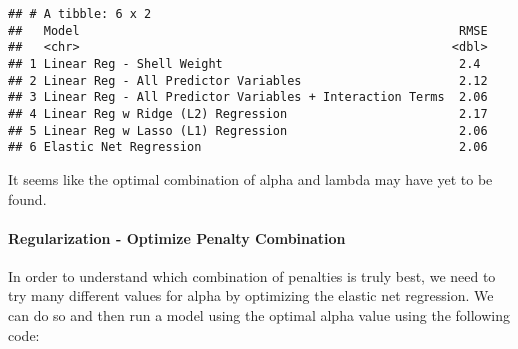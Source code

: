 \documentclass[
]{article}
\begin{document}
\begin{verbatim}
## # A tibble: 6 x 2
##   Model                                                     RMSE
##   <chr>                                                    <dbl>
## 1 Linear Reg - Shell Weight                                 2.4 
## 2 Linear Reg - All Predictor Variables                      2.12
## 3 Linear Reg - All Predictor Variables + Interaction Terms  2.06
## 4 Linear Reg w Ridge (L2) Regression                        2.17
## 5 Linear Reg w Lasso (L1) Regression                        2.06
## 6 Elastic Net Regression                                    2.06
\end{verbatim}

It seems like the optimal combination of alpha and lambda may have yet
to be found.

\hypertarget{regularization---optimize-penalty-combination}{%
\paragraph{Regularization - Optimize Penalty
Combination}\label{regularization---optimize-penalty-combination}}

In order to understand which combination of penalties is truly best, we
need to try many different values for alpha by optimizing the elastic
net regression. We can do so and then run a model using the optimal
alpha value using the following code:
\end{document}
